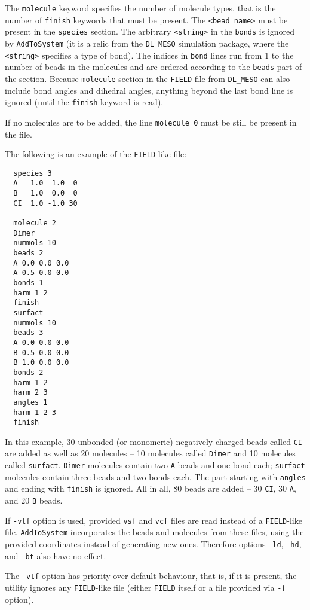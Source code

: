 The \texttt{molecule} keyword specifies the number of molecule types, that
is the number of \texttt{finish} keywords that must be present. The
\texttt{<bead name>} must be present in the \texttt{species} section. The
arbitrary \texttt{<string>} in the \texttt{bonds} is ignored by
\texttt{AddToSystem} (it is a relic from the \texttt{DL\_MESO} simulation
package, where the \texttt{<string>} specifies a type of bond). The indices
in \texttt{bond} lines run from 1 to the number of beads in the molecules and are
ordered according to the \texttt{beads} part of the section. Because
\texttt{molecule} section in the \texttt{FIELD} file from \texttt{DL\_MESO}
can also include bond angles and dihedral angles, anything beyond the last
bond line is ignored (until the \texttt{finish} keyword is read).

If no molecules are to be added, the line \texttt{molecule 0} must be still
be present in the file.

The following is an example of the \texttt{FIELD}-like file:
\begin{verbatim}
  species 3
  A   1.0  1.0  0
  B   1.0  0.0  0
  CI  1.0 -1.0 30

  molecule 2
  Dimer
  nummols 10
  beads 2
  A 0.0 0.0 0.0
  A 0.5 0.0 0.0
  bonds 1
  harm 1 2
  finish
  surfact
  nummols 10
  beads 3
  A 0.0 0.0 0.0
  B 0.5 0.0 0.0
  B 1.0 0.0 0.0
  bonds 2
  harm 1 2
  harm 2 3
  angles 1
  harm 1 2 3
  finish
\end{verbatim}
In this example, 30 unbonded (or monomeric) negatively charged beads called
\texttt{CI} are added as well as 20 molecules -- 10 molecules called
\texttt{Dimer} and 10 molecules called \texttt{surfact}. \texttt{Dimer}
molecules contain two \texttt{A} beads and one bond each; \texttt{surfact}
molecules contain three beads and two bonds each. The part starting with
\texttt{angles} and ending with \texttt{finish} is ignored. All in all, 80
beads are added -- 30 \texttt{CI}, 30 \texttt{A}, and 20 \texttt{B} beads.

If \texttt{-vtf} option is used, provided \texttt{vsf} and \texttt{vcf}
files are read instead of a \texttt{FIELD}-like file. \texttt{AddToSystem}
incorporates the beads and molecules from these files, using the provided
coordinates instead of generating new ones. Therefore options \texttt{-ld},
\texttt{-hd}, and \texttt{-bt} also have no effect.

The \texttt{-vtf} option has priority over default behaviour, that is, if
it is present, the utility ignores any \texttt{FIELD}-like file (either
\texttt{FIELD} itself or a file provided via \texttt{-f} option).

